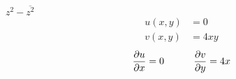 \item[16.] $z^2-\overline{z^2}$
\begin{align*}
    u(x,y) &= 0 \\
    v(x,y) &= 4xy
\end{align*}
\begin{align*}
    \frac{\partial u}{\partial x}  &= 0
    &\qquad 
    \frac{\partial v}{\partial y}  &= 4x \\ 
\end{align*}
